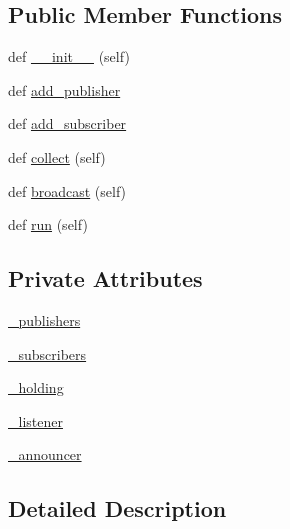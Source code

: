 \subsection*{Public Member Functions}
\begin{DoxyCompactItemize}
\item 
def \hyperlink{classmorunner_1_1communication_1_1Broadcaster_a353666919bb263e6108f2a0d77af88ed}{\+\_\+\+\_\+init\+\_\+\+\_\+} (self)
\item 
def \hyperlink{classmorunner_1_1communication_1_1Broadcaster_afe50efe55386fc0789f39288e8a22df3}{add\+\_\+publisher}
\item 
def \hyperlink{classmorunner_1_1communication_1_1Broadcaster_a5d151aa725b579b60939538251174ea1}{add\+\_\+subscriber}
\item 
def \hyperlink{classmorunner_1_1communication_1_1Broadcaster_af64ec7e4523b999b3bc0b8ad2b4a3f69}{collect} (self)
\item 
def \hyperlink{classmorunner_1_1communication_1_1Broadcaster_afb1b1e572d11b20ed3741128b57fbf6b}{broadcast} (self)
\item 
def \hyperlink{classmorunner_1_1communication_1_1Broadcaster_a61ad6f950dae096410b3703ca4aa05f9}{run} (self)
\end{DoxyCompactItemize}
\subsection*{Private Attributes}
\begin{DoxyCompactItemize}
\item 
\hyperlink{classmorunner_1_1communication_1_1Broadcaster_a7d493d4d4af6ae6ace1e22f38e32c6c0}{\+\_\+publishers}
\item 
\hyperlink{classmorunner_1_1communication_1_1Broadcaster_acc9ff1f0cf6bb65e494d8cacf497886f}{\+\_\+subscribers}
\item 
\hyperlink{classmorunner_1_1communication_1_1Broadcaster_a5c47bd16e024f775a6a690e7127a7151}{\+\_\+holding}
\item 
\hyperlink{classmorunner_1_1communication_1_1Broadcaster_aef0a924920a790ba2380db4d2b93e210}{\+\_\+listener}
\item 
\hyperlink{classmorunner_1_1communication_1_1Broadcaster_a97538f8b7d411305f21fa5e5f475fbf8}{\+\_\+announcer}
\end{DoxyCompactItemize}


\subsection{Detailed Description}


